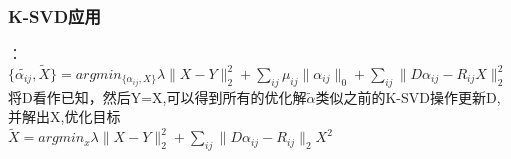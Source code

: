 \documentclass[UTF8]{beamer}
\begin{document}
\begin{frame}\frametitle{K-SVD应用}
：${\{\widetilde{\alpha_{ij}},\widetilde{X}\}}=argmin_{\{\alpha_{ij},X\}}\lambda\|X-Y\|_{2}^{2}+\sum_{ij}\mu_{ij}\|\alpha_{ij}\|_{0}+\sum_{ij}\|D\alpha_{ij}-R_{ij}X\|_{2}^{2}$
将D看作已知，然后Y=X,可以得到所有的优化解$\widetilde{\alpha}$类似之前的K-SVD操作更新D,并解出X,优化目标\\
\noindent $\widetilde{X}=argmin_{x}\lambda\|X-Y\|_{2}^{2}+\sum_{ij}\|D\alpha_{ij}-R_{ij}\|_2X^{2}$
\end{frame}
\end{document}
